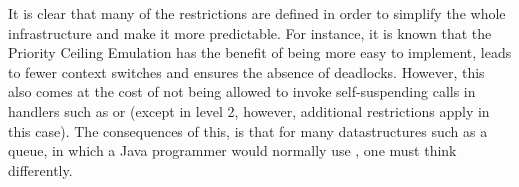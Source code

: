 It is clear that many of the restrictions are defined in order to simplify the whole infrastructure and make it more predictable. For instance, it is known that the Priority Ceiling Emulation has the benefit of being more easy to implement, leads to fewer context switches and ensures the absence of deadlocks\cite{alan2001real}. However, this also comes at the cost of not being allowed to invoke self-suspending calls in handlers such as  or  (except in level 2, however, additional restrictions apply in this case). The consequences of this, is that for many datastructures such as a queue, in which a Java programmer would normally use , one must think differently.


